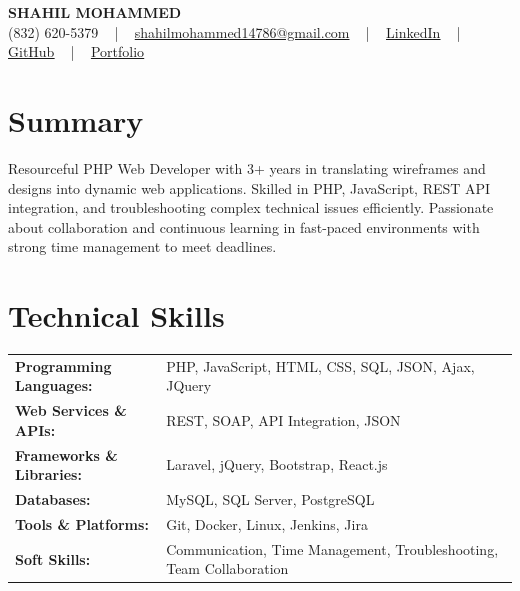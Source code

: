 \documentclass[letterpaper,11pt]{article}
\begin{document}
\begin{center}
    {\fontsize{14pt}{12pt}\selectfont \textbf{\MakeUppercase{Shahil Mohammed}}}\\ \vspace{2pt}
    \fontsize{10pt}{12pt}\selectfont (832) 620-5379 ~ | ~ \href{mailto:shahilmohammed14786@gmail.com}{shahilmohammed14786@gmail.com} ~ | ~  
    \href{https://www.linkedin.com/in/shahil-mohammed-9652931a1/}{\color{blue}\underline{LinkedIn}}  ~ | ~ 
    \href{https://github.com/freakbeast14}{\color{blue}\underline{GitHub}} ~ | ~ 
    \href{https://shahil-mohammed.netlify.app/}{\color{blue}\underline{Portfolio}}
    \vspace{-8pt}
\end{center}

\section{Summary}
\fontsize{9pt}{10pt}\selectfont
Resourceful PHP Web Developer with 3+ years in translating wireframes and designs into dynamic web applications. Skilled in PHP, JavaScript, REST API integration, and troubleshooting complex technical issues efficiently. Passionate about collaboration and continuous learning in fast-paced environments with strong time management to meet deadlines. 
 \vspace{-5pt}
 
\section{Technical Skills}
        \vspace{-14pt}
        \begin{table}[h]
            \fontsize{9pt}{10pt}\selectfont
            \begin{tabular}{p{0.3\linewidth} p{0.7\linewidth}}
                \textbf{Programming Languages:} & PHP, JavaScript, HTML, CSS, SQL, JSON, Ajax, JQuery \\
                \textbf{Web Services \& APIs:} & REST, SOAP, API Integration, JSON \\
                \textbf{Frameworks \& Libraries:} & Laravel, jQuery, Bootstrap, React.js \\
                \textbf{Databases:} & MySQL, SQL Server, PostgreSQL \\
                \textbf{Tools \& Platforms:} & Git, Docker, Linux, Jenkins, Jira \\
                \textbf{Soft Skills:} & Communication, Time Management, Troubleshooting, Team Collaboration \\
            \end{tabular}
        \end{table}
 \vspace{-15pt}
 
\end{document}

